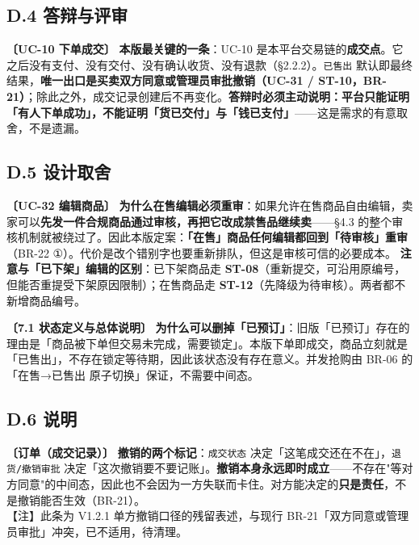 \documentclass[12pt,a4paper]{ctexart}
\begin{document}
\subsection*{D.4 答辩与评审}
{\small\textbf{〔UC-10 下单成交〕} \textbf{本版最关键的一条}：UC-10 是本平台交易链的\textbf{成交点}。它之后没有支付、没有交付、没有确认收货、没有退款（§2.2.2）。\texttt{已售出} 默认即最终结果，\textbf{唯一出口是买卖双方同意或管理员审批撤销（UC-31 / ST-10，BR-21）}；除此之外，成交记录创建后不再变化。\textbf{答辩时必须主动说明：平台只能证明「有人下单成功」，不能证明「货已交付」与「钱已支付」}——这是需求的有意取舍，不是遗漏。}\par
\vspace{0.35em}

\subsection*{D.5 设计取舍}
{\small\textbf{〔UC-32 编辑商品〕} \textbf{为什么在售编辑必须重审}：如果允许在售商品自由编辑，卖家可以\textbf{先发一件合规商品通过审核，再把它改成禁售品继续卖}——§4.3 的整个审核机制就被绕过了。因此本版定案：\textbf{「在售」商品任何编辑都回到「待审核」重审}（BR-22 ①）。代价是改个错别字也要重新排队，但这是审核可信的必要成本。 \textbf{注意与「已下架」编辑的区别}：已下架商品走 \textbf{ST-08}（重新提交，可沿用原编号，但能否重提受下架原因限制）；在售商品走 \textbf{ST-12}（先降级为待审核）。两者都不新增商品编号。}\par
\vspace{0.35em}
{\small\textbf{〔7.1 状态定义与总体说明〕} \textbf{为什么可以删掉「已预订」}：旧版「已预订」存在的理由是「商品被下单但交易未完成，需要锁定」。本版下单即成交，商品立刻就是「已售出」，不存在锁定等待期，因此该状态没有存在意义。并发抢购由 BR-06 的「在售→已售出 原子切换」保证，不需要中间态。}\par
\vspace{0.35em}

\subsection*{D.6 说明}
{\small\textbf{〔订单（成交记录）〕} \textbf{撤销的两个标记}：\texttt{成交状态} 决定「这笔成交还在不在」，\texttt{退货/撤销审批} 决定「这次撤销要不要记账」。\textbf{撤销本身永远即时成立}——不存在"等对方同意"的中间态，因此也不会因为一方失联而卡住。对方能决定的\textbf{只是责任}，不是撤销能否生效（BR-21）。 \\ {\footnotesize\color{gray}【注】此条为 V1.2.1 单方撤销口径的残留表述，与现行 BR-21「双方同意或管理员审批」冲突，已不适用，待清理。}}\par
\vspace{0.35em}
\end{document}
